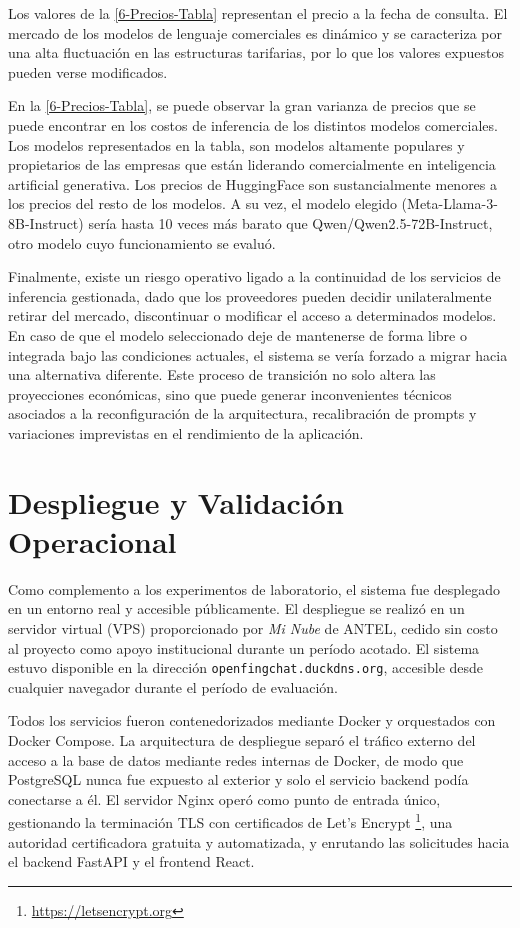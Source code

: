 Los valores de la \autoref{6-Precios-Tabla} representan el precio a la fecha de consulta. El mercado de los modelos de lenguaje comerciales es dinámico y se caracteriza por una alta fluctuación en las estructuras tarifarias, por lo que los valores expuestos pueden verse modificados.

En la \autoref{6-Precios-Tabla}, se puede observar la gran varianza de precios que se puede encontrar en los costos de inferencia de los distintos modelos comerciales. Los modelos representados en la tabla, son modelos altamente populares y propietarios de las empresas que están liderando comercialmente en inteligencia artificial generativa. Los precios de HuggingFace son sustancialmente menores a los precios del resto de los modelos. A su vez, el modelo elegido (Meta-Llama-3-8B-Instruct) sería hasta 10 veces más barato que Qwen/Qwen2.5-72B-Instruct, otro modelo cuyo funcionamiento se evaluó. 

Finalmente, existe un riesgo operativo ligado a la continuidad de los servicios de inferencia gestionada, dado que los proveedores pueden decidir unilateralmente retirar del mercado, discontinuar o modificar el acceso a determinados modelos. En caso de que el modelo seleccionado deje de mantenerse de forma libre o integrada bajo las condiciones actuales, el sistema se vería forzado a migrar hacia una alternativa diferente. Este proceso de transición no solo altera las proyecciones económicas, sino que puede generar inconvenientes técnicos asociados a la reconfiguración de la arquitectura, recalibración de prompts y variaciones imprevistas en el rendimiento de la aplicación.


\section{Despliegue y Validación Operacional}
\label{section:6-Despliegue}

Como complemento a los experimentos de laboratorio, el sistema fue desplegado en un entorno real y accesible públicamente. El despliegue se realizó en un servidor virtual (VPS) proporcionado por \textit{Mi Nube} de ANTEL, cedido sin costo al proyecto como apoyo institucional durante un período acotado. El sistema estuvo disponible en la dirección \texttt{openfingchat.duckdns.org}, accesible desde cualquier navegador durante el período de evaluación.

Todos los servicios fueron contenedorizados mediante Docker y orquestados con Docker Compose. La arquitectura de despliegue separó el tráfico externo del acceso a la base de datos mediante redes internas de Docker, de modo que PostgreSQL nunca fue expuesto al exterior y solo el servicio backend podía conectarse a él. El servidor Nginx operó como punto de entrada único, gestionando la terminación TLS con certificados de Let's Encrypt \footnote{\url{https://letsencrypt.org}}, una autoridad certificadora gratuita y automatizada, y enrutando las solicitudes hacia el backend FastAPI y el frontend React.


